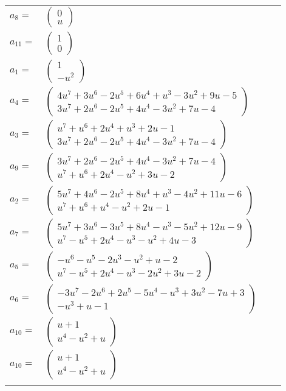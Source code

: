 \documentclass[1p]{elsarticle_modified}
\theoremstyle{definition}
\begin{document}
\begin{tabular}{m{7pt} m{180pt} m{7pt} m{180pt} }
\flushright $a_{8}=$&$\begin{pmatrix}0\\u\end{pmatrix}$ \\
\flushright $a_{11}=$&$\begin{pmatrix}1\\0\end{pmatrix}$ \\
\flushright $a_{1}=$&$\begin{pmatrix}1\\- u^2\end{pmatrix}$ \\
\flushright $a_{4}=$&$\begin{pmatrix}4 u^7+3 u^6-2 u^5+6 u^4+u^3-3 u^2+9 u-5\\3 u^7+2 u^6-2 u^5+4 u^4-3 u^2+7 u-4\end{pmatrix}$ \\
\flushright $a_{3}=$&$\begin{pmatrix}u^7+u^6+2 u^4+u^3+2 u-1\\3 u^7+2 u^6-2 u^5+4 u^4-3 u^2+7 u-4\end{pmatrix}$ \\
\flushright $a_{9}=$&$\begin{pmatrix}3 u^7+2 u^6-2 u^5+4 u^4-3 u^2+7 u-4\\u^7+u^6+2 u^4- u^2+3 u-2\end{pmatrix}$ \\
\flushright $a_{2}=$&$\begin{pmatrix}5 u^7+4 u^6-2 u^5+8 u^4+u^3-4 u^2+11 u-6\\u^7+u^6+u^4- u^2+2 u-1\end{pmatrix}$ \\
\flushright $a_{7}=$&$\begin{pmatrix}5 u^7+3 u^6-3 u^5+8 u^4- u^3-5 u^2+12 u-9\\u^7- u^5+2 u^4- u^3- u^2+4 u-3\end{pmatrix}$ \\
\flushright $a_{5}=$&$\begin{pmatrix}- u^6- u^5-2 u^3- u^2+u-2\\u^7- u^5+2 u^4- u^3-2 u^2+3 u-2\end{pmatrix}$ \\
\flushright $a_{6}=$&$\begin{pmatrix}-3 u^7-2 u^6+2 u^5-5 u^4- u^3+3 u^2-7 u+3\\- u^3+u-1\end{pmatrix}$ \\
\flushright $a_{10}=$&$\begin{pmatrix}u+1\\u^4- u^2+u\end{pmatrix}$\\ \flushright $a_{10}=$&$\begin{pmatrix}u+1\\u^4- u^2+u\end{pmatrix}$\\&\end{tabular}
\end{document}
